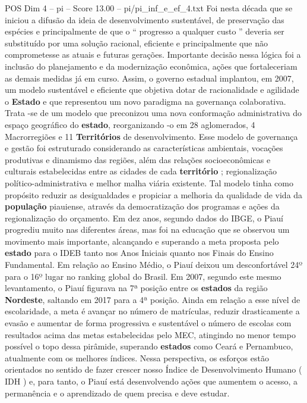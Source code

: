 \begin{textsample}{POS Dim 4 – pi – Score 13.00 – pi/pi\_inf\_e\_ef\_4.txt}
Foi nesta década que se iniciou a difusão da ideia de desenvolvimento sustentável, de preservação das espécies e principalmente de que o “ progresso a qualquer custo ” deveria ser substituído por uma solução racional, eficiente e principalmente que não comprometesse as atuais e futuras gerações.
Importante decisão nessa lógica foi a inclusão do planejamento e da modernização econômica, ações que fortaleceriam as demais medidas já em curso.
Assim, o governo estadual implantou, em 2007, um modelo sustentável e eficiente que objetiva dotar de racionalidade e agilidade o \textbf{Estado} e que representou um novo paradigma na governança colaborativa.
Trata -se de um modelo que preconizou uma nova conformação administrativa do espaço geográfico do \textbf{estado}, reorganizando -o em 28 aglomerados, 4 Macrorregiões e 11 \textbf{Territórios} de desenvolvimento.
Esse modelo de governança e gestão foi estruturado considerando as características ambientais, vocações produtivas e dinamismo das regiões, além das relações socioeconômicas e culturais estabelecidas entre as cidades de cada \textbf{território} ; regionalização político-administrativa e melhor malha viária existente.
Tal modelo tinha como propósito reduzir as desigualdades e propiciar a melhoria da qualidade de vida da \textbf{população} piauiense, através da democratização dos programas e ações da regionalização do orçamento.
Em dez anos, segundo dados do IBGE, o Piauí progrediu muito nas diferentes áreas, mas foi na educação que se observou um movimento mais importante, alcançando e superando a meta proposta pelo \textbf{estado} para o IDEB tanto nos Anos Iniciais quanto nos Finais do Ensino Fundamental.
Em relação ao Ensino Médio, o Piauí deixou um desconfortável 24º para o 16º lugar no ranking global do Brasil.
Em 2007, segundo este mesmo levantamento, o Piauí figurava na 7ª posição entre os \textbf{estados} da região \textbf{Nordeste}, saltando em 2017 para a 4ª posição.
Ainda em relação a esse nível de escolaridade, a meta é avançar no número de matrículas, reduzir drasticamente a evasão e aumentar de forma progressiva e sustentável o número de escolas com resultados acima das metas estabelecidas pelo MEC, atingindo no menor tempo possível o topo dessa pirâmide, superando \textbf{estados} como Ceará e Pernambuco, atualmente com os melhores índices.
Nessa perspectiva, os esforços estão orientados no sentido de fazer crescer nosso Índice de Desenvolvimento Humano ( IDH ) e, para tanto, o Piauí está desenvolvendo ações que aumentem o acesso, a permanência e o aprendizado de quem precisa e deve estudar.

\end{textsample}
